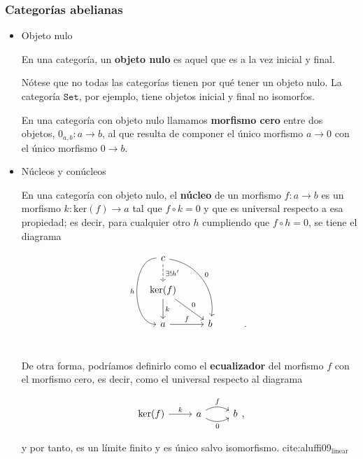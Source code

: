\documentclass[11pt]{article}
\begin{document}
\subsubsection*{Categorías abelianas}
\label{sec-7-5-4}
\begin{itemize}
\item Objeto nulo
\label{sec-7-5-4-1}
\begin{definition}
En una categoría, un \textbf{objeto nulo} es aquel que es a la vez inicial y final.
\end{definition}

Nótese que no todas las categorías tienen por qué tener un objeto nulo.
La categoría $\mathtt{Set}$, por ejemplo, tiene objetos inicial y final no isomorfos.

\begin{definition}
En una categoría con objeto nulo llamamos \textbf{morfismo cero} entre dos
objetos, $0_{a,b}\colon a \to b$, al que resulta de componer el único morfismo $a \to 0$ con 
el único morfismo $0 \to b$.
\end{definition}

\item Núcleos y conúcleos
\label{sec-7-5-4-2}
\begin{definition}
En una categoría con objeto nulo, el \textbf{núcleo} de un morfismo
$f \colon a \to b$ es un morfismo $k \colon \mathrm{ker}(f) \to a$ tal que $f\circ k = 0$ y que es universal 
respecto a esa propiedad; es decir, para cualquier otro $h$ cumpliendo 
que $f \circ h = 0$, se tiene el diagrama

\[\begin{tikzcd}
c \dar[dashed]{\exists! h'}\ar[bend right=90,swap]{dd}{h}\arrow[bend left=45]{ddr}{0} &   \\
\mathrm{ker}(f) \dar{k}\drar{0} &   \\
a\rar{f} & b & .\\
\end{tikzcd}\]
\end{definition}

De otra forma, podríamos definirlo como el \textbf{ecualizador} del morfismo $f$ con
el morfismo cero, es decir, como el universal respecto al diagrama

\[\begin{tikzcd} \mathrm{ker}(f) \rar{k} & 
a \rar[bend left]{f}\rar[bend right,swap]{0} & b
\end{tikzcd},\]

y por tanto, es un límite finito y es único salvo isomorfismo. cite:aluffi09$_{\text{linear}}$


\end{itemize}
\end{document}
